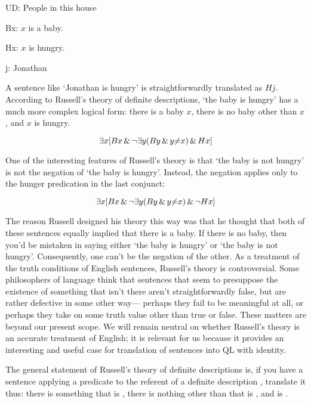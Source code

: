\begin{ekey}
\item[UD:]People in this house
\item[Bx:]$x$ is a baby.
\item[Hx:]$x$ is hungry.
\item[j:]Jonathan
\end{ekey}

A sentence like `Jonathan is hungry' is straightforwardly translated as $Hj$. According to Russell's theory of definite descriptions, `the baby is hungry' has a much more complex logical form: there is a baby $x$, there is no baby other than $x$, and $x$ is hungry.

\begin{equation*}
\exists x [Bx \,\&\, \neg \exists y (By \,\&\, y {\neq} x) \,\&\, Hx]
\end{equation*}

One of the interesting features of Russell's theory is that `the baby is not hungry' is not the negation of `the baby is hungry'. Instead, the negation applies only to the hunger predication in the last conjunct:

\begin{equation*}
\exists x [Bx \,\&\, \neg \exists y (By \,\&\, y {\neq} x) \,\&\, \neg Hx]
\end{equation*}

The reason Russell designed his theory this way was that he thought that both of these sentences equally implied that there is a baby. If there is no baby, then you'd be mistaken in saying either `the baby is hungry' or `the baby is not hungry'. Consequently, one can't be the negation of the other. As a treatment of the truth conditions of English sentences, Russell's theory is controversial. Some philosophers of language think that sentences that seem to presuppose the existence of something that isn't there aren't straightforwardly false, but are rather defective in some other way--- perhaps they fail to be meaningful at all, or perhaps they take on some truth value other than true or false. These matters are beyond our present scope. We will remain neutral on whether Russell's theory is an accurate treatment of English; it is relevant for us because it provides an interesting and useful case for translation of sentences into QL with identity.

The general statement of Russell's theory of definite descriptions is, if you have a sentence applying a predicate  to the referent of a definite description , translate it thus: there is something  that is , there is nothing other than  that is , and  is .


